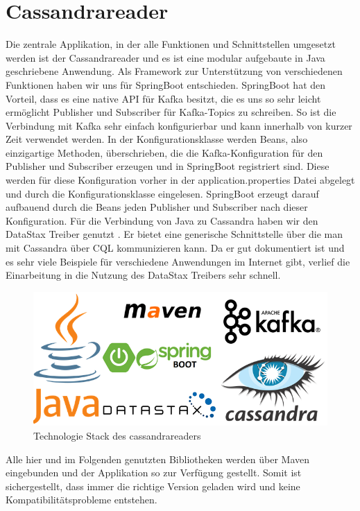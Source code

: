 \section{Cassandrareader}
Die zentrale Applikation, in der alle Funktionen und Schnittstellen umgesetzt werden ist der Cassandrareader und es ist eine modular aufgebaute in Java geschriebene Anwendung. Als Framework zur Unterstützung von verschiedenen Funktionen haben wir uns für SpringBoot entschieden. SpringBoot hat den Vorteil, dass es eine native API für Kafka besitzt, die es uns so sehr leicht ermöglicht Publisher und Subscriber für Kafka-Topics zu schreiben. So ist die Verbindung mit Kafka sehr einfach konfigurierbar und kann innerhalb von kurzer Zeit verwendet werden. In der Konfigurationsklasse werden Beans, also einzigartige Methoden, überschrieben, die die Kafka-Konfiguration für den Publisher und Subscriber erzeugen und in SpringBoot registriert sind. Diese werden für diese Konfiguration vorher in der application.properties Datei abgelegt und durch die Konfigurationsklasse eingelesen. SpringBoot erzeugt darauf aufbauend durch die Beans jeden Publisher und Subscriber nach dieser Konfiguration.
Für die Verbindung von Java zu Cassandra haben wir den DataStax Treiber genutzt \cite{DataStax}. Er bietet eine generische Schnittstelle über die man mit Cassandra über CQL kommunizieren kann. Da er gut dokumentiert ist und es sehr viele Beispiele für verschiedene Anwendungen im Internet gibt, verlief die Einarbeitung in die Nutzung des DataStax Treibers sehr schnell.
\begin{figure}[htbp]
	\centering
	\includegraphics[scale=0.5]{pics/tech_stack.png}
	\caption{Technologie Stack des cassandrareaders}
	\label{fig:techStackCass}
\end{figure}
Alle hier und im Folgenden genutzten Bibliotheken werden über Maven eingebunden und der Applikation so zur Verfügung gestellt. Somit ist sichergestellt, dass immer die richtige Version geladen wird und keine Kompatibilitätsprobleme entstehen.

